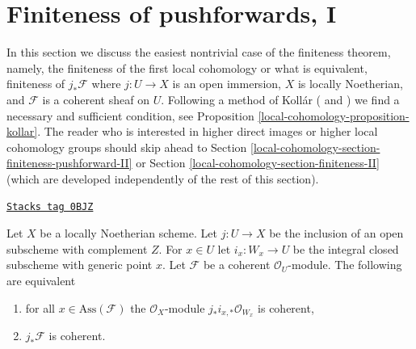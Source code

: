 \section{Finiteness of pushforwards, I}
\label{local-cohomology-section-finiteness-pushforward}
In this section we discuss the easiest nontrivial case of the
finiteness theorem, namely, the finiteness of the first local
cohomology or what is equivalent, finiteness of $j_*\mathcal{F}$
where $j : U \to X$ is an open immersion, $X$ is locally Noetherian, and
$\mathcal{F}$ is a coherent sheaf on $U$. Following a method of Koll\'ar
(\cite{Kollar-variants} and \cite{Kollar-local-global-hulls})
we find a necessary and sufficient condition, see
Proposition \ref{local-cohomology-proposition-kollar}. The reader who is interested
in higher direct images or higher local cohomology groups should skip
ahead to Section \ref{local-cohomology-section-finiteness-pushforward-II} or
Section \ref{local-cohomology-section-finiteness-II} (which are developed
independently of the rest of this section).

\begin{lemma}
\label{local-cohomology-lemma-check-finiteness-pushforward-on-associated-points}
\href{https://stacks.math.columbia.edu/tag/0BJZ}{\texttt{Stacks tag 0BJZ}}

Let $X$ be a locally Noetherian scheme. Let $j : U \to X$ be the inclusion
of an open subscheme with complement $Z$. For $x \in U$ let
$i_x : W_x \to U$ be the integral closed subscheme with generic point $x$.
Let $\mathcal{F}$ be a coherent $\mathcal{O}_U$-module.
The following are equivalent
\begin{enumerate}
\item for all $x \in \text{Ass}(\mathcal{F})$ the
$\mathcal{O}_X$-module $j_*i_{x, *}\mathcal{O}_{W_x}$ is coherent,
\item $j_*\mathcal{F}$ is coherent.
\end{enumerate}
\end{lemma}

